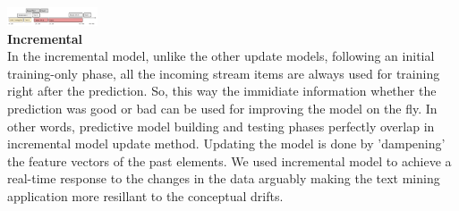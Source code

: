    \includegraphics[width=0.2\textwidth]{./time_models/Errortriggered}\\
\textbf{\large Incremental}\\
In the incremental model, unlike the other update models, following an initial training-only phase, all the incoming stream items are always used for training right after the prediction. So, this way the immidiate information whether the prediction was good or bad can be used for improving the model on the fly. In other words, predictive model building and testing phases perfectly overlap in incremental model update method. Updating the model is done by 'dampening' the feature vectors of the past elements. We used incremental model to achieve a real-time response to the changes in the data arguably making the text mining application more resillant to the conceptual drifts.

